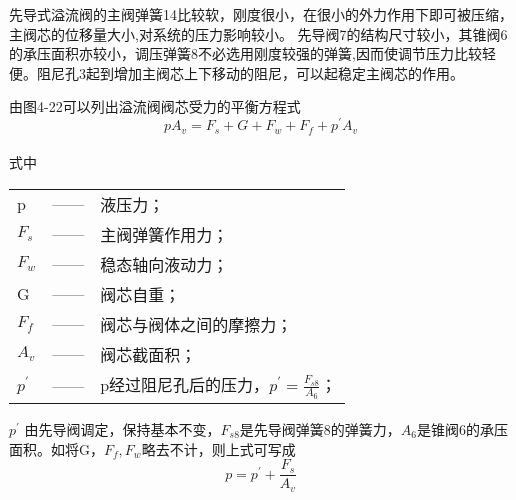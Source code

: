 
先导式溢流阀的主阀弹簧14比较软，刚度很小，在很小的外力作用下即可被压缩，主阀芯的位移量大小,对系统的压力影响较小。
先导阀7的结构尺寸较小，其锥阀6的承压面积亦较小，调压弹簧8不必选用刚度较强的弹簧,因而使调节压力比较轻便。阻尼孔3起到增加主阀芯上下移动的阻尼，可以起稳定主阀芯的作用。%
\par 由图4-22可以列出溢流阀阀芯受力的平衡方程式
\begin{equation}
   pA_{v}=F_{s}+G+F_{w}+F_{f}+p^{'}A_{v}\tag{4-1} %
\end{equation}
\\式中\
\begin{tabular}[t]{lp{8mm}l}
   p &—— &液压力；\\
   $F_{s}$ &—— &主阀弹簧作用力；\\
   $F_{w}$ &——&稳态轴向液动力；\\
  G &——&阀芯自重；\\
  $F_{f}$&——&阀芯与阀体之间的摩擦力；\\
 $A_{v}$&——&阀芯截面积；\\
  $p^{'}$&——&p经过阻尼孔后的压力，$p^{'}=\frac{F_{s8}}{A_6}$；\\
\end{tabular}
\par $p^{'}$ 由先导阀调定，保持基本不变，$F_{s8}$是先导阀弹簧8的弹簧力，$A_{6}$是锥阀6的承压面积。如将G，$F_f,F_w$略去不计，则上式可写成
\begin{equation}
   p=p^{'}+\frac{F_{s}}{A_v}\tag{4-2}
\end{equation}
  
